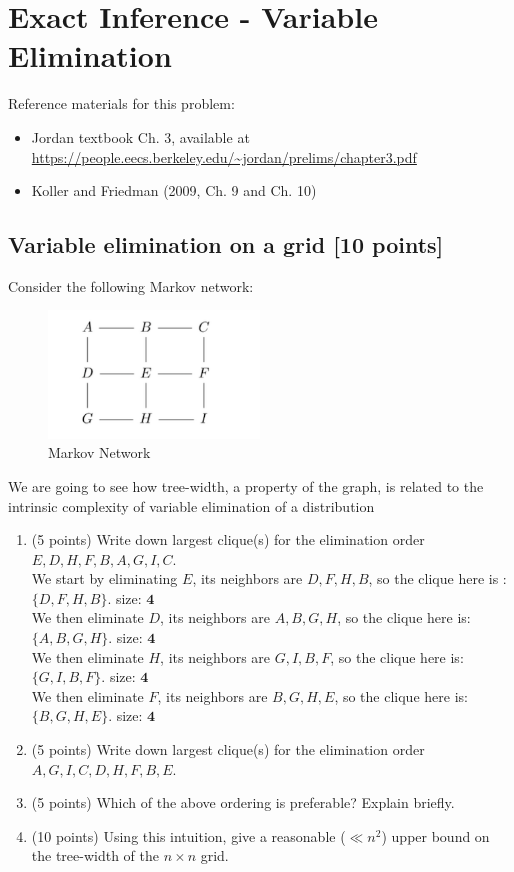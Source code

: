 \documentclass[a3paper,12pt]{extarticle} %
\begin{document}
\section{Exact Inference - Variable Elimination}

Reference materials for this problem:
\begin{itemize}
    \item Jordan textbook Ch. 3, available at \url{https://people.eecs.berkeley.edu/~jordan/prelims/chapter3.pdf}
    \item Koller and Friedman (2009, Ch. 9 and Ch. 10)
\end{itemize}

\subsection{Variable elimination on a grid [10 points]}
Consider the following Markov network:
\begin{figure}[h]
    \centering
    \includegraphics[width=0.5\textwidth]{bn4.png}
    \caption{Markov Network}
\end{figure}

We are going to see how tree-width, a property of the graph, is related to the intrinsic complexity of
variable elimination of a distribution

\begin{enumerate}
\item (5 points) Write down largest clique(s) for the elimination order \(E, D, H, F, B, A, G, I, C\).
\\ We start by eliminating \(E\), its neighbors are \(D, F, H, B\), so the clique here is :\(\{D, F, H, B\}\). size: \(\textbf{4}\)
\\ We then eliminate \(D\), its neighbors are \(A, B, G, H\), so the clique here is: \(\{A, B, G, H\}\). size: \(\textbf{4}\)
\\ We then eliminate \(H\), its neighbors are \(G, I, B, F\), so the clique here is: \(\{G, I, B, F\}\). size: \(\textbf{4}\)
\\ We then eliminate \(F\), its neighbors are \(B, G, H, E\), so the clique here is: \(\{B, G, H, E\}\). size: \(\textbf{4}\)

\item (5 points) Write down largest clique(s) for the elimination order \(A, G, I, C, D, H, F, B, E\).

\item (5 points) Which of the above ordering is preferable? Explain briefly.

\item (10 points) Using this intuition, give a reasonable (\(\ll n^2\)) upper bound on the tree-width of the \(n \times n\) grid.

\end{enumerate}
\end{document}
